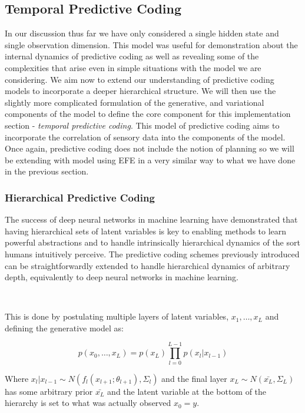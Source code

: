 \documentclass{article}
\begin{document}
\subsection{Temporal Predictive Coding}

In our discussion thus far we have only considered a single hidden state and single observation dimension. This model was useful for demonstration about the internal dynamics of predictive coding as well as revealing some of the complexities that arise even in simple situations with the model we are considering. We aim now to extend our understanding of predictive coding models to incorporate a deeper hierarchical structure. \citep{friston2008hierarchical} We will then use the slightly more complicated formulation of the generative, and variational components of the model to define the core component for this implementation section - \textit{temporal predictive coding}. This model of predictive coding aims to incorporate the correlation of sensory data into the components of the model. Once again, predictive coding does not include the notion of planning so we will be extending with model using EFE in a very similar way to what we have done in the previous section.

\subsubsection{Hierarchical Predictive Coding}

The success of deep neural networks in machine learning have demonstrated that having hierarchical sets of latent variables is key to enabling methods to learn powerful abstractions and to handle intrinsically hierarchical dynamics of the sort humans intuitively perceive. The predictive coding schemes previously introduced can be straightforwardly extended to handle hierarchical dynamics of arbitrary depth, equivalently to deep neural networks in machine learning.

\

This is done by postulating multiple layers of latent variables, $x_1, \dots, x_L$ and defining the generative model as:

\begin{equation}
	p(x_0, \dots, x_L) = p(x_L) \prod_{l = 0}^{L - 1} p(x_l | x_{l-1})
\end{equation}

Where $x_l | x_{l - 1} \sim N(f_l(x_{l + 1}; \theta_{l + 1}) , \Sigma_l)$ and the final layer $x_L \sim N(\bar{x_L}, \Sigma_L)$ has some arbitrary prior $\bar{x_L}$ and the latent variable at the bottom of the hierarchy is set to what was actually observed $x_0 = y$. 
\end{document}
